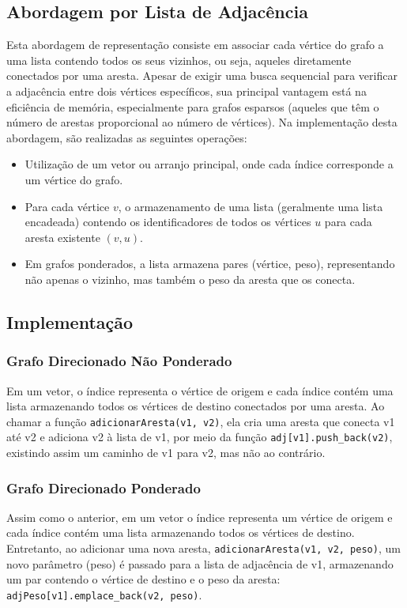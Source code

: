 \documentclass[12pt]{article}
\begin{document}
\subsection{Abordagem por Lista de Adjacência}
Esta abordagem de representação consiste em associar cada vértice do grafo a uma lista contendo 
todos os seus vizinhos, ou seja, aqueles diretamente conectados por uma aresta. Apesar de exigir 
uma busca sequencial para verificar a adjacência entre dois vértices específicos, sua principal 
vantagem está na eficiência de memória, especialmente para grafos esparsos (aqueles que têm o 
número de arestas proporcional ao número de vértices). Na implementação desta abordagem, são 
realizadas as seguintes operações:

\begin{itemize}
    \item Utilização de um vetor ou arranjo principal, onde cada índice corresponde a um vértice do grafo.
    \item Para cada vértice $v$, o armazenamento de uma lista (geralmente uma lista encadeada) contendo os identificadores de todos os vértices $u$ para cada aresta existente $(v, u)$.
    \item Em grafos ponderados, a lista armazena pares (vértice, peso), representando não apenas o vizinho, mas também o peso da aresta que os conecta.
\end{itemize}

\subsection{Implementação}

\subsubsection{Grafo Direcionado Não Ponderado}
Em um vetor, o índice representa o vértice de origem e cada índice contém uma 
lista armazenando todos os vértices de destino conectados por uma 
aresta. Ao chamar a função \texttt{adicionarAresta(v1, v2)}, ela cria uma aresta que conecta 
v1 até v2 e adiciona v2 à lista de v1, por meio da função \texttt{adj[v1].push\_back(v2)}, 
existindo assim um caminho de v1 para v2, mas não ao contrário.

\subsubsection{Grafo Direcionado Ponderado}
Assim como o anterior, em um vetor o índice representa um vértice de origem e 
cada índice contém uma lista armazenando todos os vértices de destino. 
Entretanto, ao adicionar uma nova aresta, \texttt{adicionarAresta(v1, v2, peso)}, um novo 
parâmetro (peso) é passado para a lista de adjacência de v1, armazenando um par 
contendo o vértice de destino e o peso da aresta: \texttt{adjPeso[v1].emplace\_back(v2, peso)}.
\end{document}
